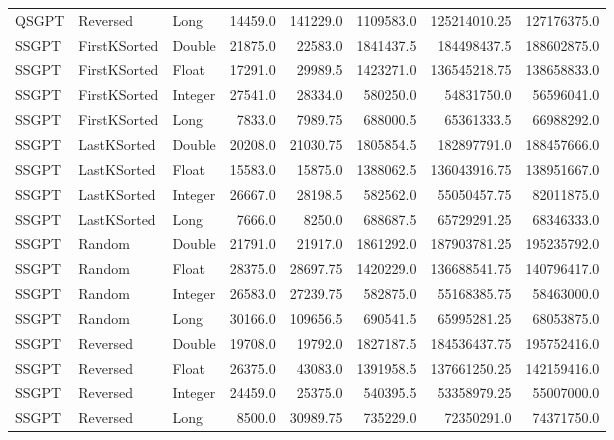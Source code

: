 \documentclass[unicode,11pt,a4paper,oneside,numbers=endperiod,openany]{scrartcl}
\begin{document}
\begin{center}
\begin{longtable}{|l|l|l|r|r|r|r|r|}
            QSGPT & Reversed & Long & 14459.0 & 141229.0 & 1109583.0 & 125214010.25 & 127176375.0 \\
            SSGPT & FirstKSorted & Double & 21875.0 & 22583.0 & 1841437.5 & 184498437.5 & 188602875.0 \\
            SSGPT & FirstKSorted & Float & 17291.0 & 29989.5 & 1423271.0 & 136545218.75 & 138658833.0 \\
            SSGPT & FirstKSorted & Integer & 27541.0 & 28334.0 & 580250.0 & 54831750.0 & 56596041.0 \\
            SSGPT & FirstKSorted & Long & 7833.0 & 7989.75 & 688000.5 & 65361333.5 & 66988292.0 \\
            SSGPT & LastKSorted & Double & 20208.0 & 21030.75 & 1805854.5 & 182897791.0 & 188457666.0 \\
            SSGPT & LastKSorted & Float & 15583.0 & 15875.0 & 1388062.5 & 136043916.75 & 138951667.0 \\
            SSGPT & LastKSorted & Integer & 26667.0 & 28198.5 & 582562.0 & 55050457.75 & 82011875.0 \\
            SSGPT & LastKSorted & Long & 7666.0 & 8250.0 & 688687.5 & 65729291.25 & 68346333.0 \\
            SSGPT & Random & Double & 21791.0 & 21917.0 & 1861292.0 & 187903781.25 & 195235792.0 \\
            SSGPT & Random & Float & 28375.0 & 28697.75 & 1420229.0 & 136688541.75 & 140796417.0 \\
            SSGPT & Random & Integer & 26583.0 & 27239.75 & 582875.0 & 55168385.75 & 58463000.0 \\
            SSGPT & Random & Long & 30166.0 & 109656.5 & 690541.5 & 65995281.25 & 68053875.0 \\
            SSGPT & Reversed & Double & 19708.0 & 19792.0 & 1827187.5 & 184536437.75 & 195752416.0 \\
            SSGPT & Reversed & Float & 26375.0 & 43083.0 & 1391958.5 & 137661250.25 & 142159416.0 \\
            SSGPT & Reversed & Integer & 24459.0 & 25375.0 & 540395.5 & 53358979.25 & 55007000.0 \\
            SSGPT & Reversed & Long & 8500.0 & 30989.75 & 735229.0 & 72350291.0 & 74371750.0 \\
            \hline
        \end{longtable}
    \end{center}
\end{document}
